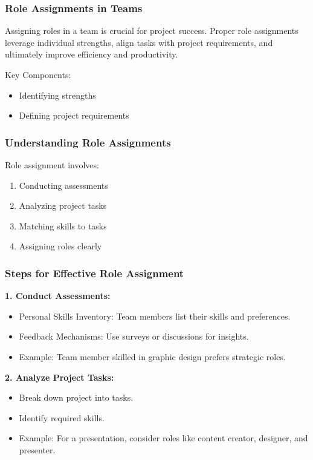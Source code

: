 \documentclass[aspectratio=169]{beamer}
\begin{document}
\begin{frame}[fragile]
    \frametitle{Role Assignments in Teams}
    Assigning roles in a team is crucial for project success. 
    Proper role assignments leverage individual strengths, align tasks with project requirements, and ultimately improve efficiency and productivity.

    Key Components:
    \begin{itemize}
        \item Identifying strengths
        \item Defining project requirements
    \end{itemize}
\end{frame}

\begin{frame}[fragile]
    \frametitle{Understanding Role Assignments}
    Role assignment involves:
    \begin{enumerate}
        \item Conducting assessments
        \item Analyzing project tasks
        \item Matching skills to tasks
        \item Assigning roles clearly
    \end{enumerate}
\end{frame}

\begin{frame}[fragile]
    \frametitle{Steps for Effective Role Assignment}
    \textbf{1. Conduct Assessments:}
    \begin{itemize}
        \item Personal Skills Inventory: Team members list their skills and preferences.
        \item Feedback Mechanisms: Use surveys or discussions for insights.
        \item Example: Team member skilled in graphic design prefers strategic roles.
    \end{itemize}

    \textbf{2. Analyze Project Tasks:}
    \begin{itemize}
        \item Break down project into tasks.
        \item Identify required skills.
        \item Example: For a presentation, consider roles like content creator, designer, and presenter.
    \end{itemize}
\end{frame}
\end{document}
